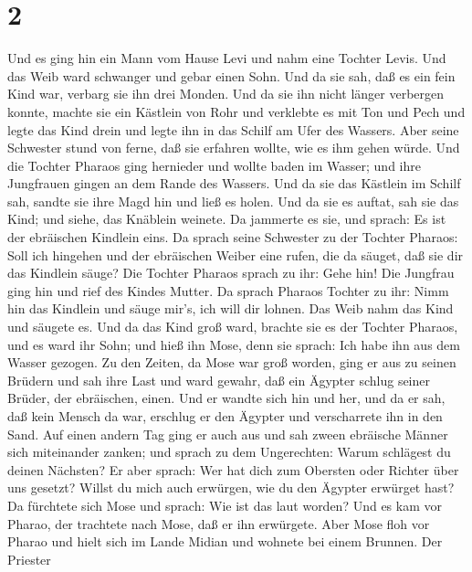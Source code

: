 \hypertarget{section-1}{%
\section{2}\label{section-1}}

 Und es ging hin ein Mann vom Hause Levi und nahm eine
Tochter Levis.  Und das Weib ward schwanger und gebar einen
Sohn. Und da sie sah, daß es ein fein Kind war, verbarg sie ihn drei
Monden.  Und da sie ihn nicht länger verbergen konnte,
machte sie ein Kästlein von Rohr und verklebte es mit Ton und Pech und
legte das Kind drein und legte ihn in das Schilf am Ufer des Wassers.
 Aber seine Schwester stund von ferne, daß sie erfahren
wollte, wie es ihm gehen würde.  Und die Tochter Pharaos
ging hernieder und wollte baden im Wasser; und ihre Jungfrauen gingen an
dem Rande des Wassers. Und da sie das Kästlein im Schilf sah, sandte sie
ihre Magd hin und ließ es holen.  Und da sie es auftat, sah
sie das Kind; und siehe, das Knäblein weinete. Da jammerte es sie, und
sprach: Es ist der ebräischen Kindlein eins.  Da sprach
seine Schwester zu der Tochter Pharaos: Soll ich hingehen und der
ebräischen Weiber eine rufen, die da säuget, daß sie dir das Kindlein
säuge?  Die Tochter Pharaos sprach zu ihr: Gehe hin! Die
Jungfrau ging hin und rief des Kindes Mutter.  Da sprach
Pharaos Tochter zu ihr: Nimm hin das Kindlein und säuge mir's, ich will
dir lohnen. Das Weib nahm das Kind und säugete es.  Und da
das Kind groß ward, brachte sie es der Tochter Pharaos, und es ward ihr
Sohn; und hieß ihn Mose, denn sie sprach: Ich habe ihn aus dem Wasser
gezogen.  Zu den Zeiten, da Mose war groß worden, ging er
aus zu seinen Brüdern und sah ihre Last und ward gewahr, daß ein Ägypter
schlug seiner Brüder, der ebräischen, einen.  Und er wandte
sich hin und her, und da er sah, daß kein Mensch da war, erschlug er den
Ägypter und verscharrete ihn in den Sand.  Auf einen andern
Tag ging er auch aus und sah zween ebräische Männer sich miteinander
zanken; und sprach zu dem Ungerechten: Warum schlägest du deinen
Nächsten?  Er aber sprach: Wer hat dich zum Obersten oder
Richter über uns gesetzt? Willst du mich auch erwürgen, wie du den
Ägypter erwürget hast? Da fürchtete sich Mose und sprach: Wie ist das
laut worden?  Und es kam vor Pharao, der trachtete nach
Mose, daß er ihn erwürgete. Aber Mose floh vor Pharao und hielt sich im
Lande Midian und wohnete bei einem Brunnen.  Der Priester
